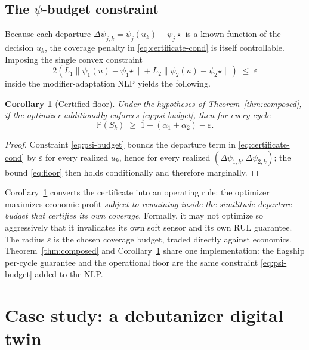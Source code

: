 \documentclass[review,12pt]{elsarticle}
\newtheorem{corollary}{Corollary}
\theoremstyle{definition}
\begin{document}
\subsection{The $\psi$-budget constraint}
\label{sec:budget}

Because each departure $\Delta\psi_{j,k} = \psi_j(u_k) - \psi_j\!\star$ is a known
function of the decision $u_k$, the coverage penalty in
\eqref{eq:certificate-cond} is itself controllable. Imposing the single convex
constraint
\begin{equation}
2\!\left(L_1\|\psi_1(u) - \psi_1\!\star\| + L_2\|\psi_2(u) - \psi_2\!\star\|\right) \;\le\; \varepsilon
\label{eq:psi-budget}
\end{equation}
inside the modifier-adaptation NLP yields the following.

\begin{corollary}[Certified floor]
\label{cor:floor}
Under the hypotheses of Theorem~\ref{thm:composed}, if the optimizer additionally
enforces \eqref{eq:psi-budget}, then for every cycle
\begin{equation}
\mathbb{P}(S_k) \;\ge\; 1 - (\alpha_1 + \alpha_2) - \varepsilon.
\label{eq:floor}
\end{equation}
\end{corollary}

\begin{proof}
Constraint \eqref{eq:psi-budget} bounds the departure term in
\eqref{eq:certificate-cond} by $\varepsilon$ for every realized $u_k$, hence for
every realized $(\Delta\psi_{1,k},\Delta\psi_{2,k})$; the bound
\eqref{eq:floor} then holds conditionally and therefore marginally.
\end{proof}

Corollary~\ref{cor:floor} converts the certificate into an operating rule: the
optimizer maximizes economic profit \emph{subject to remaining inside the
similitude-departure budget that certifies its own coverage}. Formally, it may
not optimize so aggressively that it invalidates its own soft sensor and its own
RUL guarantee. The radius $\varepsilon$ is the chosen coverage budget, traded
directly against economics. Theorem~\ref{thm:composed} and
Corollary~\ref{cor:floor} share one implementation: the flagship per-cycle
guarantee and the operational floor are the same constraint
\eqref{eq:psi-budget} added to the NLP.

\section{Case study: a debutanizer digital twin}
\label{sec:case}
\end{document}
